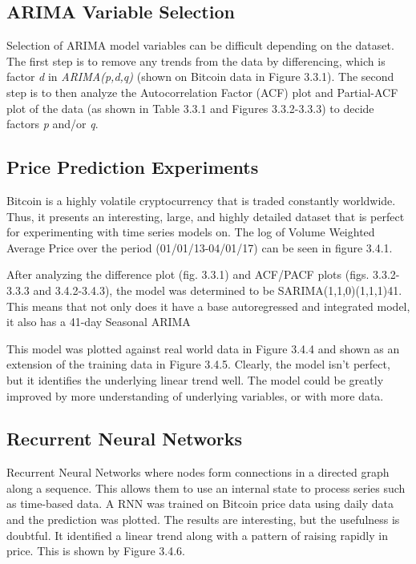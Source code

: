 \documentclass[12pt]{article}
\begin{document}
\pagebreak

\subsection {ARIMA Variable Selection}
  \par Selection of ARIMA model variables can be difficult depending on the dataset. The first step is to remove any trends from the data by differencing, which is factor \textit{d} in \textit{ARIMA(p,d,q)} (shown on Bitcoin data in Figure 3.3.1). The second step is to then analyze the Autocorrelation Factor (ACF) plot and Partial-ACF plot of the data (as shown in Table 3.3.1 and Figures 3.3.2-3.3.3) to decide factors \textit{p} and/or \textit{q}. \cite{arima_ts}

\subsection {Price Prediction Experiments}
  \par Bitcoin is a highly volatile cryptocurrency that is traded constantly worldwide. Thus, it presents an interesting, large, and highly detailed dataset that is perfect for experimenting with time series models on. The log of Volume Weighted Average Price over the period (01/01/13-04/01/17) can be seen in figure 3.4.1.

  \par After analyzing the difference plot (fig. 3.3.1) and ACF/PACF plots (figs. 3.3.2-3.3.3 and 3.4.2-3.4.3), the model was determined to be SARIMA(1,1,0)(1,1,1)41. This means that not only does it have a base autoregressed and integrated model, it also has a 41-day Seasonal ARIMA

  \par This model was plotted against real world data in Figure 3.4.4 and shown as an extension of the training data in Figure 3.4.5. Clearly, the model isn't perfect, but it identifies the underlying linear trend well. The model could be greatly improved by more understanding of underlying variables, or with more data.

\subsection {Recurrent Neural Networks}
  \par Recurrent Neural Networks where nodes form connections in a directed graph along a sequence. This allows them to use an internal state to process series such as time-based data. A RNN was trained on Bitcoin price data using daily data and the prediction was plotted. The results are interesting, but the usefulness is doubtful. It identified a linear trend along with a pattern of raising rapidly in price. This is shown by Figure 3.4.6.
\end{document}
